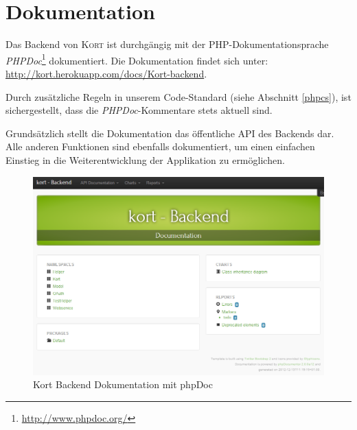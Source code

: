 \section{Dokumentation}

Das Backend von \textsc{Kort} ist durchgängig mit der PHP-Dokumentationsprache \emph{PHPDoc}\footnote{\url{http://www.phpdoc.org/}} dokumentiert.
Die Dokumentation findet sich unter: \url{http://kort.herokuapp.com/docs/Kort-backend}.

Durch zusätzliche Regeln in unserem Code-Standard (siehe Abschnitt \ref{phpcs}), ist sichergestellt, dass die \emph{PHPDoc}-Kommentare stets aktuell sind.

Grundsätzlich stellt die Dokumentation das öffentliche \gls{API} des Backends dar.
Alle anderen Funktionen sind ebenfalls dokumentiert, um einen einfachen Einstieg in die Weiterentwicklung der Applikation zu ermöglichen.

\begin{figure}[H]
	\centering
	\includegraphics[width=\textwidth]{images/implementation/backend/kort-backend-documentation}
	\caption{Kort Backend Dokumentation mit phpDoc}
	\label{image-kort-backend-documentation}
\end{figure}